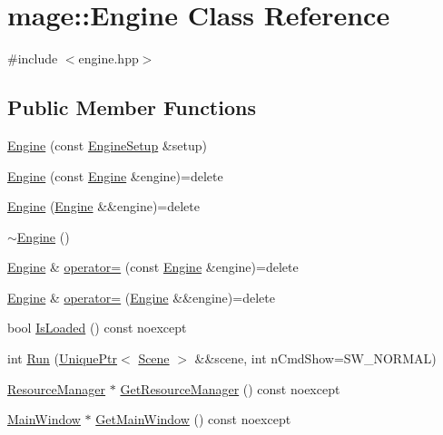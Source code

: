 \hypertarget{classmage_1_1_engine}{}\section{mage\+:\+:Engine Class Reference}
\label{classmage_1_1_engine}


{\ttfamily \#include $<$engine.\+hpp$>$}

\subsection*{Public Member Functions}
\begin{DoxyCompactItemize}
\item 
\hyperlink{classmage_1_1_engine_a99770cbb017b29c284d7f8e4c7e2b84c}{Engine} (const \hyperlink{classmage_1_1_engine_setup}{Engine\+Setup} \&setup)
\item 
\hyperlink{classmage_1_1_engine_afd2f4f32b2e803f59521aafe1924f0ba}{Engine} (const \hyperlink{classmage_1_1_engine}{Engine} \&engine)=delete
\item 
\hyperlink{classmage_1_1_engine_a275b668202a24e639ebe3056a1c845a3}{Engine} (\hyperlink{classmage_1_1_engine}{Engine} \&\&engine)=delete
\item 
\hyperlink{classmage_1_1_engine_a34628556f8397d70ed018d71e343c2f5}{$\sim$\+Engine} ()
\item 
\hyperlink{classmage_1_1_engine}{Engine} \& \hyperlink{classmage_1_1_engine_a1eedff82d4c8207c61676230520648fd}{operator=} (const \hyperlink{classmage_1_1_engine}{Engine} \&engine)=delete
\item 
\hyperlink{classmage_1_1_engine}{Engine} \& \hyperlink{classmage_1_1_engine_a22607a263e0be5e179cc0e4bf13b18f7}{operator=} (\hyperlink{classmage_1_1_engine}{Engine} \&\&engine)=delete
\item 
bool \hyperlink{classmage_1_1_engine_a55281f34ad0fd2c77f1d11c54ec66c19}{Is\+Loaded} () const noexcept
\item 
int \hyperlink{classmage_1_1_engine_a4ad554bca1ac892e1274f2e707c2a017}{Run} (\hyperlink{namespacemage_a3316d7143a973e37adf1110f2e80ca31}{Unique\+Ptr}$<$ \hyperlink{classmage_1_1_scene}{Scene} $>$ \&\&scene, int n\+Cmd\+Show=S\+W\+\_\+\+N\+O\+R\+M\+AL)
\item 
\hyperlink{classmage_1_1_resource_manager}{Resource\+Manager} $\ast$ \hyperlink{classmage_1_1_engine_a8b89ee555f5208a99872d724389eba0b}{Get\+Resource\+Manager} () const noexcept
\item 
\hyperlink{classmage_1_1_main_window}{Main\+Window} $\ast$ \hyperlink{classmage_1_1_engine_a56e7cbf3a781bd519ed79f0a75a9ce86}{Get\+Main\+Window} () const noexcept

\end{DoxyCompactItemize}
